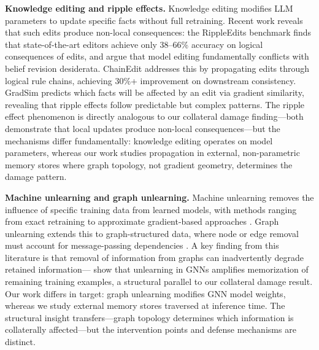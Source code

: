 \documentclass[11pt]{article}
\begin{document}
\textbf{Knowledge editing and ripple effects.}
Knowledge editing modifies LLM parameters to update specific facts without full retraining.
Recent work reveals that such edits produce non-local consequences: the RippleEdits benchmark \citep{rippleedits_2024} finds that state-of-the-art editors achieve only 38--66\% accuracy on logical consequences of edits, and \citet{belief_revision_editing_2024} argue that model editing fundamentally conflicts with belief revision desiderata.
ChainEdit \citep{chainedit_2025} addresses this by propagating edits through logical rule chains, achieving 30\%+ improvement on downstream consistency.
GradSim \citep{ripple_messy_2024} predicts which facts will be affected by an edit via gradient similarity, revealing that ripple effects follow predictable but complex patterns.
The ripple effect phenomenon is directly analogous to our collateral damage finding---both demonstrate that local updates produce non-local consequences---but the mechanisms differ fundamentally: knowledge editing operates on model parameters, whereas our work studies propagation in external, non-parametric memory stores where graph topology, not gradient geometry, determines the damage pattern.

\textbf{Machine unlearning and graph unlearning.}
Machine unlearning removes the influence of specific training data from learned models, with methods ranging from exact retraining to approximate gradient-based approaches \citep{unlearning_survey_2025}.
Graph unlearning extends this to graph-structured data, where node or edge removal must account for message-passing dependencies \citep{graph_unlearning_balance_2024}.
A key finding from this literature is that removal of information from graphs can inadvertently degrade retained information---\citet{graph_unlearning_memorization_2026} show that unlearning in GNNs amplifies memorization of remaining training examples, a structural parallel to our collateral damage result.
Our work differs in target: graph unlearning modifies GNN model weights, whereas we study external memory stores traversed at inference time.
The structural insight transfers---graph topology determines which information is collaterally affected---but the intervention points and defense mechanisms are distinct.
\end{document}
